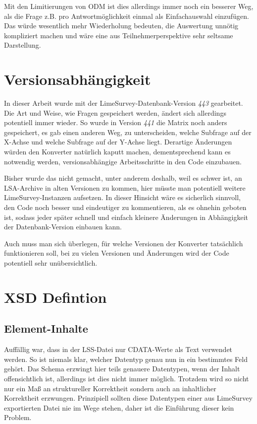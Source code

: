 Mit den Limitierungen von ODM ist dies allerdings immer noch ein besserer Weg, als die Frage z.B. pro Antwortmöglichkeit einmal als Einfachauswahl einzufügen.
Das würde wesentlich mehr Wiederholung bedeuten, die Auswertung unnötig kompliziert machen und wäre eine aus Teilnehmerperspektive sehr seltsame Darstellung.

\section{Versionsabhängigkeit}

In dieser Arbeit wurde mit der LimeSurvey-Datenbank-Version \textit{443} gearbeitet.
Die Art und Weise, wie Fragen gespeichert werden, ändert sich allerdings potentiell immer wieder.
So wurde in Version \textit{441} die Matrix noch anders gespeichert, es gab einen anderen Weg, zu unterscheiden, welche Subfrage auf der X-Achse und welche Subfrage auf der Y-Achse liegt.
Derartige Änderungen würden den Konverter natürlich kaputt machen, dementsprechend kann es notwendig werden, versionsabhängige Arbeitsschritte in den Code einzubauen.

Bisher wurde das nicht gemacht, unter anderem deshalb, weil es schwer ist, an LSA-Archive in alten Versionen zu kommen, hier müsste man potentiell weitere LimeSurvey-Instanzen aufsetzen.
In dieser Hinsicht wäre es sicherlich sinnvoll, den Code noch besser und eindeutiger zu kommentieren, als es ohnehin geboten ist, sodass jeder später schnell und einfach kleinere Änderungen in Abhängigkeit der Datenbank-Version einbauen kann.

Auch muss man sich überlegen, für welche Versionen der Konverter tatsächlich funktionieren soll, bei zu vielen Versionen und Änderungen wird der Code potentiell sehr unübersichtlich.

\section{XSD Defintion}

\subsection{Element-Inhalte}

Auffällig war, dass in der LSS-Datei nur CDATA-Werte als Text verwendet werden.
So ist niemals klar, welcher Datentyp genau nun in ein bestimmtes Feld gehört.
Das Schema erzwingt hier teils genauere Datentypen, wenn der Inhalt offensichtlich ist, allerdings ist dies nicht immer möglich.
Trotzdem wird so nicht nur ein Maß an struktureller Korrektheit sondern auch an inhaltlicher Korrektheit erzwungen.
Prinzipiell sollten diese Datentypen einer aus LimeSurvey exportierten Datei nie im Wege stehen, daher ist die Einführung dieser kein Problem.


